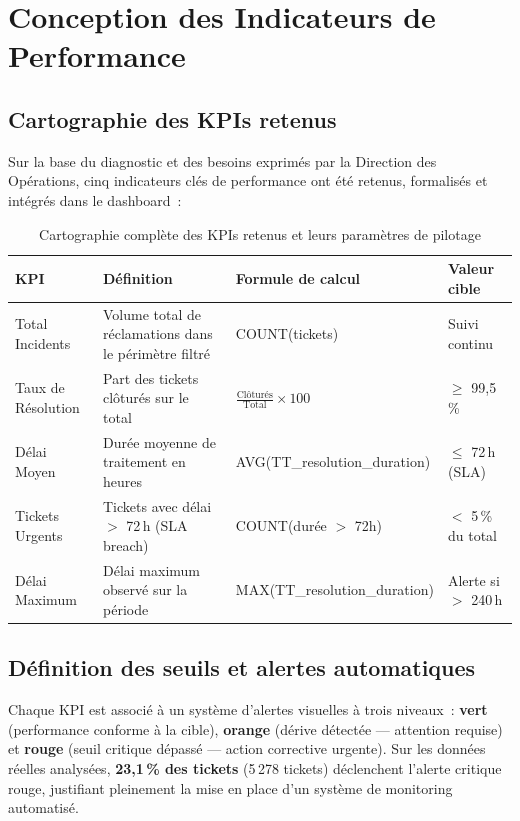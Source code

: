 \documentclass[10pt,a4paper]{report}
\begin{document}
\section{Conception des Indicateurs de Performance}

\subsection{Cartographie des KPIs retenus}

Sur la base du diagnostic et des besoins exprimés par la Direction des Opérations, cinq indicateurs clés de performance ont été retenus, formalisés et intégrés dans le dashboard~:

\begin{table}[H]
\centering
\caption{Cartographie complète des KPIs retenus et leurs paramètres de pilotage}
\begin{tabularx}{\textwidth}{L{3.2cm} L{3.5cm} L{3cm} L{2.5cm}}
\toprule
{}
\textbf{\color{ttblue}KPI} & \textbf{\color{ttblue}Définition} & \textbf{\color{ttblue}Formule de calcul} & \textbf{\color{ttblue}Valeur cible} \\
\midrule
Total Incidents & Volume total de réclamations dans le périmètre filtré & COUNT(tickets) & Suivi continu \\
Taux de Résolution & Part des tickets clôturés sur le total & $\frac{\text{Clôturés}}{\text{Total}} \times 100$ & $\geq$ 99,5\,\% \\
Délai Moyen & Durée moyenne de traitement en heures & AVG(TT\_resolution\_duration) & $\leq$ 72\,h (SLA) \\
Tickets Urgents & Tickets avec délai $>$ 72\,h (SLA breach) & COUNT(durée $>$ 72h) & $<$ 5\,\% du total \\
Délai Maximum & Délai maximum observé sur la période & MAX(TT\_resolution\_duration) & Alerte si $>$ 240\,h \\
\bottomrule
\end{tabularx}
\label{tab:kpis-conception}
\end{table}

\subsection{Définition des seuils et alertes automatiques}

Chaque KPI est associé à un système d'alertes visuelles à trois niveaux~: \textcolor{ttgreen}{\textbf{vert}} (performance conforme à la cible), \textcolor{ttorange}{\textbf{orange}} (dérive détectée --- attention requise) et \textcolor{ttred}{\textbf{rouge}} (seuil critique dépassé --- action corrective urgente). Sur les données réelles analysées, \textbf{23,1\,\% des tickets} (5\,278 tickets) déclenchent l'alerte critique rouge, justifiant pleinement la mise en place d'un système de monitoring automatisé.
\end{document}
